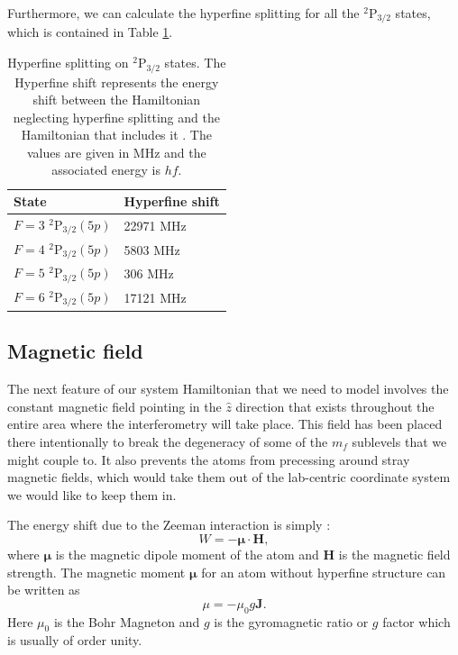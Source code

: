 Furthermore, we can calculate the hyperfine splitting for all the $^2$P$_{3/2}$ states, which is contained in Table \ref{tableOfHyperfinedeetuings}.

\begin{table}[h]
\centering
\begin{tabular}{|l|l|}
\hline
State & Hyperfine shift  \\ \hline \hline
$F=3$ $^2$P$_{3/2} (5p)$ & 22971  MHz\\ \hline
$F=4$ $^2$P$_{3/2} (5p)$ &  5803 MHz\\ \hline
$F=5$ $^2$P$_{3/2} (5p)$ &  306 MHz\\ \hline
$F=6$ $^2$P$_{3/2} (5p)$ &   17121 MHz\\ \hline
\end{tabular}
\caption{Hyperfine splitting on $^2$P$_{3/2}$ states. The Hyperfine shift represents the energy shift between the Hamiltonian neglecting hyperfine splitting and the Hamiltonian that includes it
. The values are given in MHz and the associated energy is $hf$. }
\label{tableOfHyperfinedeetuings}
\end{table}

\subsection{Magnetic field}\label{zeeman}

The next feature of our system Hamiltonian that we need to model involves the constant magnetic field pointing in the $\hat{z}$ direction that exists throughout the entire area where the interferometry will take place. This field has been placed there intentionally to break the degeneracy of some of the $m_f$ sublevels that we might couple to. It also prevents the atoms from precessing around stray magnetic fields, which would take them out of the lab-centric coordinate system we would like to keep them in.

The energy shift due to the Zeeman interaction is simply \cite{sobelman_spectra}: 
\begin{equation}
W=-\mathbf{\mu}\cdot\mathbf{H},
\end{equation}
where $\mathbf{\mu}$ is the magnetic dipole moment of the atom and $\mathbf{H}$ is the magnetic field strength. The magnetic moment $\mathbf{\mu}$ for an atom without hyperfine structure can be written as \cite{sobelman_spectra}
\begin{equation}
\mu=-\mu_0 g \mathbf{J}.
\end{equation}
Here $\mu_0$ is the Bohr Magneton and $g$ is the gyromagnetic ratio or $g$ factor which is usually of order unity. 

